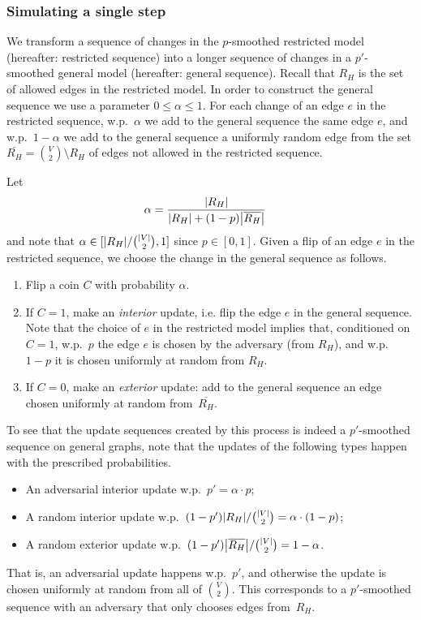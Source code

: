 \documentclass[letter,11pt]{article}
\begin{document}
\subsubsection{Simulating a single step}
We transform a sequence of changes in the $p$-smoothed restricted model (hereafter: restricted sequence) into a longer sequence of changes in a $p'$-smoothed general model (hereafter: general sequence). Recall that $R_H$ is the set of allowed edges in the restricted model.
In order to construct the general sequence we use a parameter $0\leq\alpha\leq 1$. 
For each change of an edge $e$ in the restricted sequence, w.p.~$\alpha$ we add to the general sequence the same edge $e$, and w.p.~$1-\alpha$ we add to the general sequence a uniformly random edge from the set $\overline{R_H} = \binom{V}{2} \setminus R_H$ of edges not allowed in the restricted sequence. 

Let
\[
\begin{aligned}
	&\alpha = \frac{\card{R_H}}{\card{R_H} + (1-p)\card{\overline{R_H}}}
\end{aligned}
\]
and note that $\alpha \in [\card{R_H} / \binom{\card{V}}{2} , 1]$ since $p\in[0 , 1]$.
Given a flip of an edge $e$ in the restricted sequence, we choose the change in the general sequence as follows.
\begin{enumerate}
    \item Flip a coin $C$ with probability $\alpha$.

    \item If $C = 1$, make an \emph{interior} update, i.e. flip the edge $e$ in the general sequence.
    Note that the choice of $e$ in the restricted model implies that, conditioned on $C=1$, w.p.~$p$ the edge $e$ is chosen by the adversary (from $R_H$), and w.p.~$1-p$ it is chosen uniformly at random from $R_H$.

    \item If $C = 0$, make an \emph{exterior} update: add to the general sequence an edge chosen uniformly at random from~$\overline{R_H}$.
\end{enumerate} 

To see that the update sequences created by this process is indeed a $p'$-smoothed sequence on general graphs, note that the updates of the following types happen with the prescribed probabilities.
\begin{itemize}
    \item An adversarial interior update w.p.~$p' = \alpha \cdot p$;

    \item A random interior update w.p.~$(1-p')\card{R_H}/\binom{\card{V}}{2} = \alpha \cdot (1-p)$;

    \item A random exterior update w.p.~$(1-p')\card{\overline{R_H}}/\binom{\card{V}}{2} = 1 - \alpha$.
\end{itemize}
That is, an adversarial update happens w.p.~$p'$, and otherwise the update is chosen uniformly at random from all of $\binom{V}{2}$. 
This corresponds to a $p'$-smoothed sequence with an adversary that only chooses edges from~$R_H$.
\end{document}

